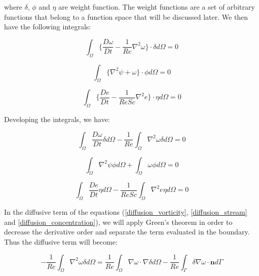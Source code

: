 \noindent
where $\delta$, $\phi$ and $\eta$ are weight function.
The weight functions are a set of arbitrary functions 
that belong to a function space that will be discussed later. 
We then have the following integrals:

\begin{equation}
 \int_{\Omega} \Bigg\{ 
 \frac{D \omega}{D t}
 -
 \frac{1}{Re} \nabla^{2} \omega
\Bigg\} \cdot \delta d\Omega = 0
\end{equation}

\begin{equation}
 \int_{\Omega} \big\{ \nabla^2 \psi + \omega \big\} \cdot \phi d\Omega = 0
\end{equation}

\begin{equation}
 \int_{\Omega} \Bigg\{ 
 \frac{D e}{Dt}
 -
 \frac{1}{ReSc} \nabla^{2} e
 \Bigg\} \cdot \eta d\Omega = 0
\end{equation}



\noindent
Developing the integrals, we have:

\begin{equation} \label{diffusion_vorticity} 
   \int_{\Omega} \frac{D \omega}{Dt} \delta d\Omega 
 - \frac{1}{\textit{Re}} \int_{\Omega} \nabla^2 \omega \delta d\Omega
 = 0
\end{equation}

\begin{equation} \label{diffusion_stream}
   \int_{\Omega} \nabla^2 \psi \phi d\Omega
 + \int_{\Omega} \omega \phi d\Omega = 0
\end{equation}

\begin{equation} \label{diffusion_concentration} 
   \int_{\Omega} \frac{D e}{Dt} \eta d\Omega
 - \frac{1}{\textit{ReSc}} \int_{\Omega} \nabla^2 e \eta d\Omega 
 = 0
\end{equation}

\medskip
In the diffusive term of the equations (\ref{diffusion_vorticity}, \ref{diffusion_stream} and \ref{diffusion_concentration}),
we will apply Green's theorem in order to decrease 
the derivative order and separate the term evaluated in the boundary. 
Thus the diffusive term will become:

\begin{equation} \label{diffusion2_vorticity} 
 - \frac{1}{\textit{Re}} \int_{\Omega} \nabla^2 \omega \delta d\Omega
 = \frac{1}{\textit{Re}} \int_{\Omega} \nabla \omega \cdot \nabla \delta d\Omega
 - \frac{1}{\textit{Re}} \int_{\Gamma} \delta \nabla \omega \cdot \textbf{n} d\Gamma
\end{equation}

